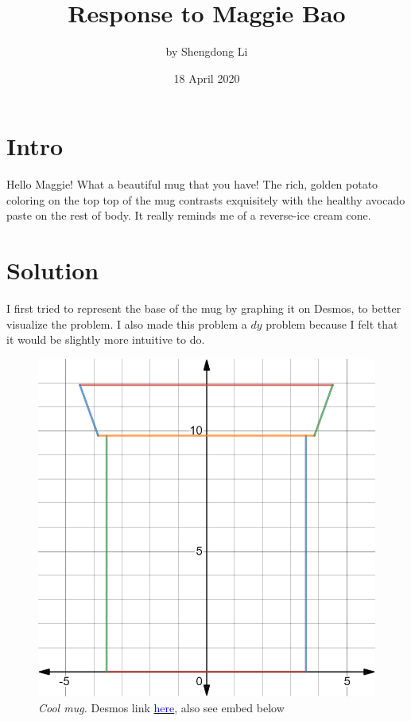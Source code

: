 \documentclass[letterpaper, 12pt]{article}
\begin{document}
\title{Response to Maggie Bao}
\author{by Shengdong Li}
\date{18 April 2020}
\maketitle
\section{Intro}
Hello Maggie! What a beautiful mug that you have! The rich, golden potato coloring on the top top of the mug contrasts exquisitely with the healthy avocado paste on the rest of body. It really reminds me of a reverse-ice cream cone.
\section{Solution}
I first tried to represent the base of the mug by graphing it on Desmos, to better visualize the problem. I also made this problem a $dy$ problem because I felt that it would be slightly more intuitive to do.
\begin{figure}[h]
    \begin{center}
        \includegraphics[scale=.3]{mug.png}
        \caption{\textit{Cool mug.} Desmos link \href{https://www.desmos.com/calculator/ms6wz8unq4}{\textcolor{blue}{here}}, also see embed below}
    \end{center}
\end{figure}
\end{document}
